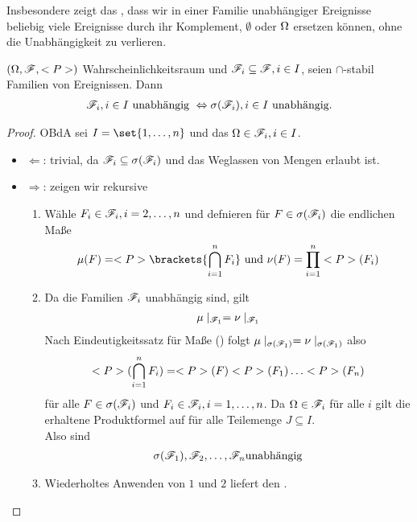 Insbesondere zeigt das , dass wir in einer Familie unabhängiger Ereignisse beliebig viele Ereignisse durch ihr Komplement, $\emptyset$ oder $\Omega$ ersetzen können, ohne die Unabhängigkeit zu verlieren.
\begin{proposition}
	$(\Omega, \mathscr{F}, <P>)$ Wahrscheinlichkeitsraum und $\mathscr{F}_i \subseteq \mathscr{F}, i \in I$, seien $\cap$-stabil Familien von Ereignissen. Dann
	\begin{align*}
		\mathscr{F}_i, i \in I \text{ unabhängig } \Leftrightarrow \sigma(\mathscr{F}_i), i \in I \text{ unabhängig}. 
	\end{align*}
\end{proposition}

\begin{proof}
	OBdA sei $I = \set{1, \dots, n}$ und das $\Omega \in \mathscr{F}_i, i \in I$.
	\begin{itemize}
		\item $\Leftarrow$: trivial, da $\mathscr{F}_i \subseteq \sigma(\mathscr{F}_i)$ und das Weglassen von Mengen erlaubt ist.
		\item $\Rightarrow$: zeigen wir rekursive
			\begin{enumerate}
				\item Wähle $F_i \in \mathscr{F}_i, i = 2, \dots,n$ und defnieren für $F \in \sigma(\mathscr{F}_i)$ die endlichen Maße
				\begin{align*}
					\mu(F) = \P\brackets{\bigcap_{i=1}^n F_i} \und \nu(F) = \prod_{i=1}^n \P(F_i)
				\end{align*}
				\item Da die Familien $\mathscr{F}_i$ unabhängig sind, gilt
				\begin{align*}
					\mu\mid_{\mathscr{F}_1} = \nu\mid_{\mathscr{F}_1}
				\end{align*}
				Nach Eindeutigkeitssatz für Maße () folgt $\mu\mid_{\sigma(\mathscr{F}_1)} = \nu\mid_{\sigma(\mathscr{F}_1)}$ also
				\begin{align*}
					\P(\bigcap_{i=1}^n F_i) = \P(F)\P(F_1)\dots \P(F_n)
				\end{align*}
				für alle $F \in \sigma(\mathscr{F}_i)$ und $F_i \in \mathscr{F}_i, i = 1, \dots, n$. Da $\Omega \in \mathscr{F}_i$ für alle $i$ gilt die erhaltene Produktformel auf für alle Teilemenge $J \subseteq I$.\\
				Also sind
				\begin{align*}
					\sigma(\mathscr{F}_1), \mathscr{F}_2, \dots, \mathscr{F}_n \text{unabhängig}
				\end{align*}
				\item Wiederholtes Anwenden von $1$ und $2$ liefert den .
			\end{enumerate}
	\end{itemize}
\end{proof}

